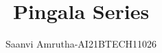 \documentclass[journal,12pt,twocolumn]{IEEEtran}
\begin{document}
\let\StandardTheFigure\thefigure
\renewcommand{\thefigure}{\theproblem}



\def\putbox#1#2#3{\makebox[0in][l]{\makebox[#1][l]{}\raisebox{\baselineskip}[0in][0in]{\raisebox{#2}[0in][0in]{#3}}}}
     \def\rightbox#1{\makebox[0in][r]{#1}}
     \def\centbox#1{\makebox[0in]{#1}}
     \def\topbox#1{\raisebox{-\baselineskip}[0in][0in]{#1}}
     \def\midbox#1{\raisebox{-0.5\baselineskip}[0in][0in]{#1}}

\vspace{3cm}

\title{ 
Pingala Series
}


%
%
%

\author{ Saanvi Amrutha-AI21BTECH11026 %
}
% 
%
\end{document}
